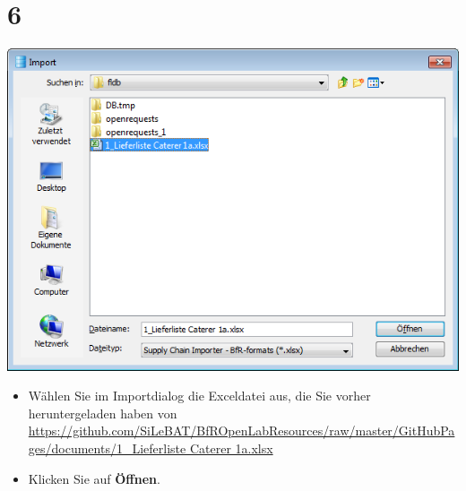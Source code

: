 \documentclass{beamer}
\begin{document}
\section{6}
\begin{frame}
	\begin{center}
  		\includegraphics[height=0.6\textheight]{6.png}
	\end{center}
	\begin{itemize}
		\item Wählen Sie im Importdialog die Exceldatei aus, die Sie vorher heruntergeladen haben von  \url{https://github.com/SiLeBAT/BfROpenLabResources/raw/master/GitHubPages/documents/1_Lieferliste Caterer 1a.xlsx}
		\item Klicken Sie auf \textbf{Öffnen}.
	\end{itemize}
\end{frame}
\end{document}
